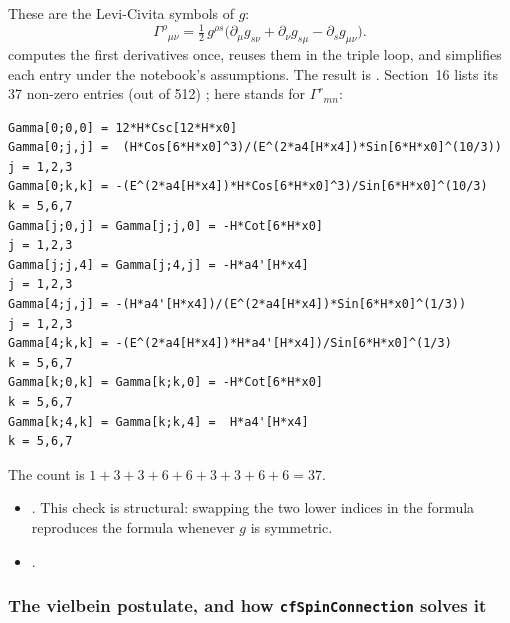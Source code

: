 These are the Levi-Civita symbols of $g$:
\begin{equation}
  \Gamma^\rho{}_{\mu\nu}=\tfrac12\,g^{\rho s}\bigl(\partial_\mu g_{s\nu}+\partial_\nu g_{s\mu}-\partial_s g_{\mu\nu}\bigr).
\end{equation}
 computes the first derivatives
 once, reuses them in the triple loop, and simplifies
each entry under the notebook's assumptions. The result is .
Section~16 lists its 37 non-zero entries (out of 512) ; here
 stands for $\Gamma^r{}_{mn}$:

{\scriptsize
\begin{verbatim}
Gamma[0;0,0] = 12*H*Csc[12*H*x0]
Gamma[0;j,j] =  (H*Cos[6*H*x0]^3)/(E^(2*a4[H*x4])*Sin[6*H*x0]^(10/3))   j = 1,2,3
Gamma[0;k,k] = -(E^(2*a4[H*x4])*H*Cos[6*H*x0]^3)/Sin[6*H*x0]^(10/3)      k = 5,6,7
Gamma[j;0,j] = Gamma[j;j,0] = -H*Cot[6*H*x0]                             j = 1,2,3
Gamma[j;j,4] = Gamma[j;4,j] = -H*a4'[H*x4]                               j = 1,2,3
Gamma[4;j,j] = -(H*a4'[H*x4])/(E^(2*a4[H*x4])*Sin[6*H*x0]^(1/3))         j = 1,2,3
Gamma[4;k,k] = -(E^(2*a4[H*x4])*H*a4'[H*x4])/Sin[6*H*x0]^(1/3)           k = 5,6,7
Gamma[k;0,k] = Gamma[k;k,0] = -H*Cot[6*H*x0]                             k = 5,6,7
Gamma[k;4,k] = Gamma[k;k,4] =  H*a4'[H*x4]                               k = 5,6,7
\end{verbatim}
}
\noindent The count is $1+3+3+6+6+3+3+6+6=37$.
\begin{itemize}
  \item {} . This check is structural: swapping the two lower indices in the formula reproduces the formula whenever $g$ is symmetric.
  \item {} .
\end{itemize}

\subsubsection{The vielbein postulate, and how \texorpdfstring{\texttt{cfSpinConnection}}{cfSpinConnection} solves it}
\label{csc:postulate}\label{sec:3.8.5}

